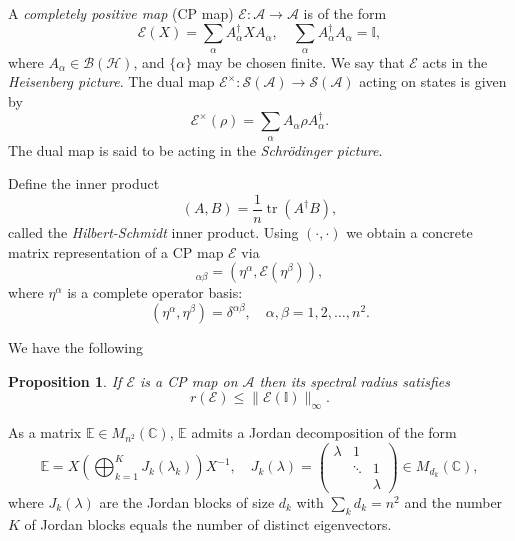 \documentclass[11pt,oneside]{amsart}
\DeclareMathOperator{\tr}{tr}
\theoremstyle{plain}%
\newtheorem{proposition}[theorem]{Proposition}
\theoremstyle{definition}
\theoremstyle{remark}
\begin{document}
A \emph{completely positive map} (CP map) $\mathcal{E}:\mathcal{A}\rightarrow \mathcal{A}$ is of the form
\begin{equation}
	\mathcal{E}(X) = \sum_{\alpha} A_\alpha^\dag X A_\alpha, \quad \sum_{\alpha} A_\alpha^\dag A_\alpha = \mathbb{I},
\end{equation}
where $A_\alpha \in \mathcal{B}(\mathcal{H})$, and $\{\alpha\}$ may be chosen finite. We say that $\mathcal{E}$ acts in the \emph{Heisenberg picture}. The dual map $\mathcal{E}^\times : \mathcal{S}(\mathcal{A})\rightarrow \mathcal{S}(\mathcal{A})$ acting on states is given by
\begin{equation}
	\mathcal{E}^\times(\rho) = \sum_{\alpha} A_\alpha \rho A_{\alpha}^\dag.
\end{equation}
The dual map is said to be acting in the \emph{Schr\"odinger picture}.

Define the inner product
\begin{equation}
	(A,B) = \frac1n\tr(A^\dag B),
\end{equation}
called the \emph{Hilbert-Schmidt} inner product. Using $(\cdot, \cdot)$ we obtain a concrete matrix representation of a CP map $\mathcal{E}$ via
\begin{equation}
	[\mathbb{E}]_{\alpha\beta} = (\eta^\alpha, \mathcal{E}(\eta^\beta)),
\end{equation}
where $\eta^\alpha$ is a complete operator basis:
\begin{equation}
	(\eta^{\alpha}, \eta^{\beta}) = \delta^{\alpha\beta}, \quad \alpha, \beta = 1,2, \ldots, n^2.
\end{equation}

We have the following
\begin{proposition}
	If $\mathcal{E}$ is a CP map on $\mathcal{A}$ then its spectral radius satisfies
	\begin{equation}
	r(\mathcal{E}) \le \|\mathcal{E}(\mathbb{I})\|_{\infty}.
	\end{equation}
\end{proposition}

As a matrix $\mathbb{E} \in M_{n^2}(\mathbb{C})$, $\mathbb{E}$ admits a Jordan decomposition of the form
\begin{equation}
	\mathbb{E} = X\left(\bigoplus_{k=1}^K J_k(\lambda_k)\right)X^{-1}, \quad J_k(\lambda) = \begin{pmatrix}\lambda & 1  & \\ & \ddots & 1 \\ && \lambda \end{pmatrix}\in M_{d_k}(\mathbb{C}),
\end{equation}
where $J_k(\lambda)$ are the Jordan blocks of size $d_k$ with $\sum_{k} d_k = n^2$ and the number $K$ of Jordan blocks equals the number of distinct eigenvectors.
\end{document}

